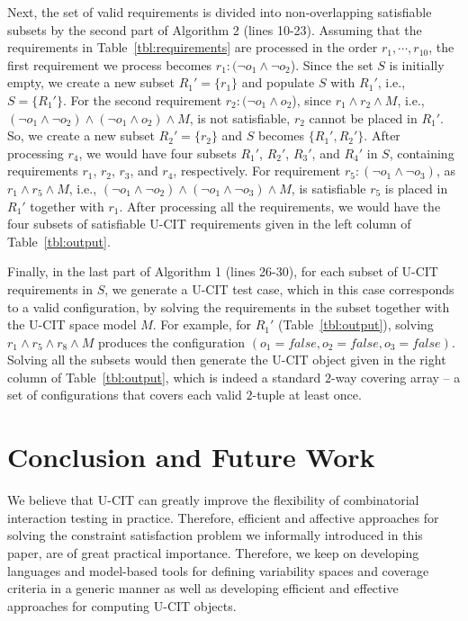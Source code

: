 \documentclass[EPiCempty]{easychair}
\begin{document}
Next, the set of valid requirements is divided into non-overlapping satisfiable  subsets by the second part of Algorithm 2 (lines 10-23). Assuming that the requirements in Table~\ref{tbl:requirements} are processed in the order $r_1, \cdots, r_{10}$, the first requirement we process becomes $r_1: (\neg o_1 \wedge \neg o_2$). Since the set $S$ is initially empty, we create a new subset $R_1' = \{r_1\}$ and populate $S$ with $R_1'$, i.e., $S=\{R_1'\}$. For the second requirement $r_2: (\neg o_1 \wedge o_2$), since $r_1 \wedge r_2 \wedge M$, i.e., $(\neg o_1 \wedge \neg o_2) \wedge (\neg o_1 \wedge o_2) \wedge M$, is not satisfiable, $r_2$ cannot be placed in $R_1'$. So, we create a new subset $R_2'=\{r_2\}$ and $S$ becomes $\{R_1', R_2'\}$. After processing $r_4$, we would have four subsets $R_1'$, $R_2'$, $R_3'$, and $R_4'$ in $S$, containing requirements $r_1$, $r_2$, $r_3$, and $r_4$, respectively. For requirement $r_5: (\neg o_1 \wedge \neg o_3)$, as $r_1 \wedge r_5 \wedge M$, i.e., $(\neg o_1 \wedge \neg o_2) \wedge (\neg o_1 \wedge \neg o_3) \wedge M$, is satisfiable $r_5$ is placed in $R_1'$ together with $r_1$. After processing all the requirements, we would have the four subsets of satisfiable U-CIT requirements given in the left column of Table~\ref{tbl:output}.
 
Finally, in the last part of Algorithm 1 (lines 26-30), for each subset of U-CIT requirements in $S$, we generate a U-CIT test case, which in this case corresponds to a valid configuration, by solving the requirements in the subset together with the U-CIT space model $M$. For example, for $R_1'$ (Table~\ref{tbl:output}), solving $r_1 \wedge r_5 \wedge r_8 \wedge M$ produces the configuration $(o_1=false, o_2=false, o_3=false)$. Solving all the subsets would then generate the U-CIT object given in the right column of Table~\ref{tbl:output}, which is indeed a standard $2$-way covering array -- a set of configurations that covers each valid $2$-tuple at least once.

\section{Conclusion and Future Work} \label{conclusion}

We believe that U-CIT can greatly improve the flexibility of combinatorial interaction testing in practice. Therefore, efficient and affective approaches for solving the constraint satisfaction problem we informally introduced in this paper, are of great practical importance. Therefore, we keep on developing languages and model-based tools for defining variability spaces and coverage criteria in a generic manner as well as developing efficient and effective approaches for computing U-CIT objects.





\end{document}
